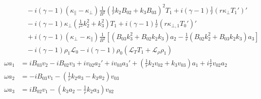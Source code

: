 \documentclass[11pt, fleqn]{article}
\newcommand{\HL}{\mathscr{L}}
\begin{document}
\begin{equation}
\begin{aligned}
											&~~~~ - i(\gamma - 1)(\kappa_\parallel - \kappa_\bot)\frac{1}{B^2}\left(\frac{1}{r}k_2B_{02} + k_3B_{03}\right)^2T_1 + i(\gamma - 1)\frac{1}{r}(r\kappa_\bot T_1')'															\\
											&~~~~ - i(\gamma - 1)\kappa_\bot\left(\frac{1}{r^2}k_2^2 + k_3^2\right)T_1 + i(\gamma - 1)\frac{1}{r}(r\kappa_{\bot, 1}T_0')'																																		\\
											&~~~~ + i(\gamma - 1)(\kappa_\bot - \kappa_\parallel)\frac{1}{B^2}\left[(B_{03}k_3^2 + B_{02}k_2k_3)a_2 - \frac{1}{r}(B_{02}k_2^2 + B_{03}k_2k_3)a_3\right]																			\\
											&~~~~ - i(\gamma - 1)\rho_1\HL_0 - i(\gamma - 1)\rho_0(\HL_T T_1 + \HL_\rho \rho_1)																																																							\\[8pt]
		\omega a_1				&= iB_{03}v_2 - iB_{02}v_3 + iv_{02}a_2' + iv_{03}a_3' + \left(\frac{1}{r}k_2v_{02} + k_3v_{03}\right)a_1 + i\frac{1}{r}v_{02}a_2																																\\[8pt]
		\omega a_2				&= -iB_{03}v_1 - \left(\frac{1}{r}k_2a_3 - k_3a_2\right)v_{03}																																																																	\\[8pt]
		\omega a_3				&=  iB_{02}v_1 - \left(k_3a_2 - \frac{1}{r}k_2a_3\right)v_{02}
	\end{aligned}
\end{equation}

\newpage
\end{document}
